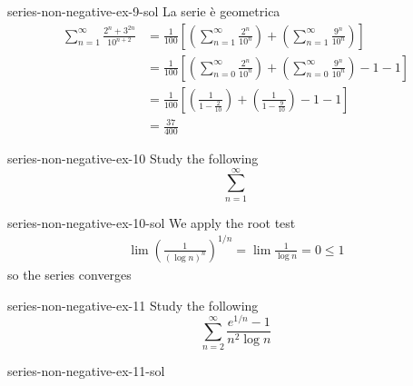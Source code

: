 \documentclass[preview]{standalone}
\begin{document}
\begin{snippetsolution}{series-non-negative-ex-9-sol}{}
    La serie è geometrica
    \begin{align*}
        \sum_{n=1}^\infty \frac{
            2^n + 3^{2n}
        }{
            10^{n+2}
        } &=
        \frac{1}{100} \left[
            \left(\sum_{n=1}^\infty \frac{
            2^n
        }{
            10^{n}
        }\right)
        +
        \left(\sum_{n=1}^\infty \frac{
            9^{n}
        }{
            10^{n}
        }\right)
        \right]
        \\
        &= 
        \frac{1}{100} \left[
            \left(\sum_{n=0}^\infty \frac{
            2^n
        }{
            10^{n}
        }\right)
        +
        \left(\sum_{n=0}^\infty \frac{
            9^{n}
        }{
            10^{n}
        }\right)
        -1-1
        \right]
        \\
        &= 
        \frac{1}{100} \left[
            \left(\frac{1}{1 - \frac{2}{10}}\right)
        +
        \left(\frac{1}{1 - \frac{9}{10}}\right)
        -1-1
        \right] \\
        &= \frac{37}{400}
    \end{align*}
\end{snippetsolution}

\begin{snippetexercise}{series-non-negative-ex-10}{}
    Study the following \series
    \[
        \sum_{n=1}^\infty 
    \]
\end{snippetexercise}

\begin{snippetsolution}{series-non-negative-ex-10-sol}{}
    We apply the root test
    \begin{align*}
        \lim {\left(\frac{
            1
        }{
            {(\log n)}^n
        }\right)}^{1/n}
        = \lim \frac{1}{\log n} = 0 \leq 1
    \end{align*}
    so the series converges
\end{snippetsolution}

\begin{snippetexercise}{series-non-negative-ex-11}{}
    Study the following \series
    \[
        \sum_{n=2}^\infty \frac{
            e^{1/n} - 1
        }{
            n^2 \log n
        }
    \] %
\end{snippetexercise}

\begin{snippetsolution}{series-non-negative-ex-11-sol}{}
    \todo
\end{snippetsolution}
\end{document}

